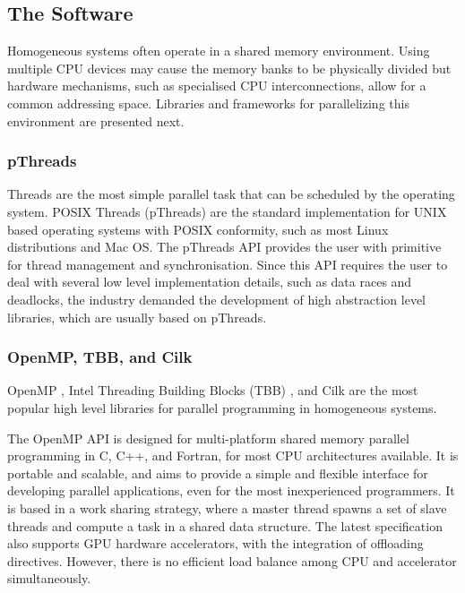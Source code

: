 \subsection{The Software}
\label{shared_mem}

Homogeneous systems often operate in a shared memory environment. Using multiple CPU devices may cause the memory banks to be physically divided but hardware mechanisms, such as specialised CPU interconnections, allow for a common addressing space. Libraries and frameworks for parallelizing this environment are presented next.

\subsubsection*{pThreads}

Threads are the most simple parallel task that can be scheduled by the operating system. POSIX Threads (pThreads) are the standard implementation for UNIX based operating systems with POSIX conformity, such as most Linux distributions and Mac OS. The pThreads API provides the user with primitive for thread management and synchronisation. Since this API requires the user to deal with several low level implementation details, such as data races and deadlocks, the industry demanded the development of high abstraction level libraries, which are usually based on pThreads.

\subsubsection*{OpenMP, TBB, and Cilk}

OpenMP \cite{OpenMP}, Intel Threading Building Blocks (TBB) \cite{Intel:TBB}, and Cilk \cite{Intel:Cilk} are the most popular high level libraries for parallel programming in homogeneous systems.

The OpenMP API is designed for multi-platform shared memory parallel programming in C, C++, and Fortran, for most CPU architectures available. It is portable and scalable, and aims to provide a simple and flexible interface for developing parallel applications, even for the most inexperienced programmers. It is based in a work sharing strategy, where a master thread spawns a set of slave threads and compute a task in a shared data structure. The latest specification also supports GPU hardware accelerators, with the integration of offloading directives. However, there is no efficient load balance among CPU and accelerator simultaneously.


